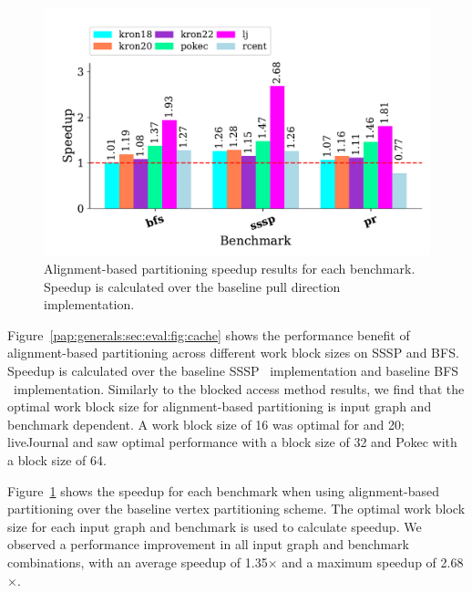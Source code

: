 \begin{figure}[!ht]
    \centering
    \includegraphics[scale = 0.6]{graphit-figures/align.pdf}
    \caption{Alignment-based partitioning speedup results for each benchmark. Speedup is calculated over the baseline pull direction implementation.} %
    \label{pap:generals:sec:eval:fig:aligned}
\end{figure}
 
Figure~\ref{pap:generals:sec:eval:fig:cache} shows the performance benefit of alignment-based partitioning across different work block sizes on SSSP and BFS.
Speedup is calculated over the baseline SSSP \pull~implementation and baseline BFS \pull~implementation. 
Similarly to the blocked access method results, we find that the optimal work block size for alignment-based partitioning is input graph and benchmark dependent. 
A work block size of 16 was optimal for  and 20; liveJournal and  saw optimal performance with a block size of 32 and Pokec with a block size of 64.

Figure~\ref{pap:generals:sec:eval:fig:aligned} shows the speedup for each benchmark when using alignment-based partitioning over the baseline vertex partitioning scheme. 
The optimal work block size for each input graph and benchmark is used to calculate speedup. 
We observed a performance improvement in all input graph and benchmark combinations, with an average speedup of 1.35$\times$ and a maximum speedup of 2.68$\times$. 
 
